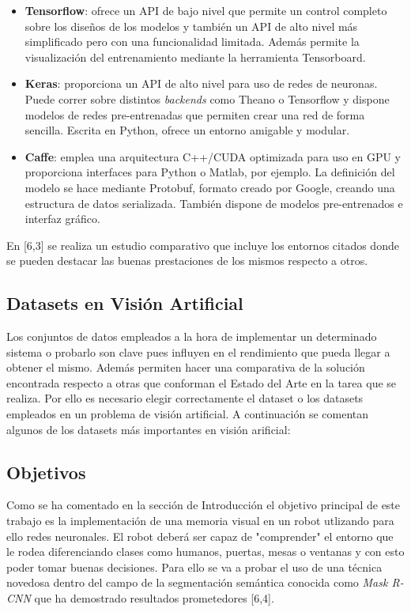 \documentclass{bmvc2k}
\begin{document}
\begin{itemize}
\item \textbf{Tensorflow}: ofrece un API de bajo nivel que permite un control completo sobre los diseños de los modelos y también un API de alto nivel más simplificado pero con una funcionalidad limitada. Además permite la visualización del entrenamiento mediante la herramienta Tensorboard.
\item \textbf{Keras}: proporciona un API de alto nivel para uso de redes de neuronas. Puede correr sobre distintos \textit{backends} como Theano o Tensorflow y dispone modelos de redes pre-entrenadas que permiten crear una red de forma sencilla. Escrita en Python, ofrece un entorno amigable y modular.
\item \textbf{Caffe}: emplea una arquitectura C++/CUDA optimizada para uso en GPU y proporciona interfaces para Python o Matlab, por ejemplo. La definición del modelo se hace mediante Protobuf, formato creado por Google, creando una estructura de datos serializada. También dispone de modelos pre-entrenados e interfaz gráfico.
\end{itemize}
En [6,3] se realiza un estudio comparativo que incluye los entornos citados donde se pueden destacar las buenas prestaciones de los mismos respecto a otros.\\

\subsection{Datasets en Visión Artificial}
Los conjuntos de datos empleados a la hora de implementar un determinado sistema o probarlo son clave pues influyen en el rendimiento que pueda llegar a obtener el mismo. Además permiten hacer una comparativa de la solución encontrada respecto a otras que conforman el Estado del Arte en la tarea que se realiza. Por ello es necesario elegir correctamente el dataset o los datasets empleados en un problema de visión artificial. A continuación se comentan algunos de los datasets más importantes en visión arificial: 
\subsection{Objetivos}
Como se ha comentado en la sección de Introducción el objetivo principal de este trabajo es la implementación de una memoria visual en un robot utlizando para ello redes neuronales. El robot deberá ser capaz de "comprender" el entorno que le rodea diferenciando clases como humanos, puertas, mesas o ventanas y con esto poder tomar buenas decisiones. Para ello se va a probar el uso de una técnica novedosa dentro del campo de la segmentación semántica conocida como \textit{Mask R-CNN} que ha demostrado resultados prometedores [6,4].
\end{document}

